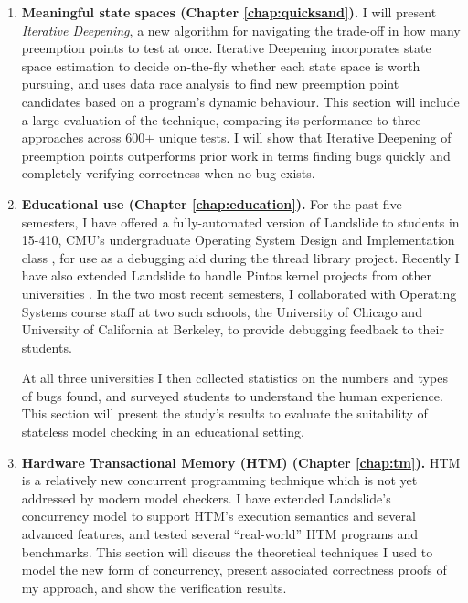 \begin{enumerate}
	\item {\bf Meaningful state spaces (Chapter \ref{chap:quicksand}).}
		I will present {\em Iterative Deepening}, a new algorithm for navigating the trade-off in how many preemption points to test at once.
		Iterative Deepening incorporates state space estimation \cite{estimation} to decide on-the-fly whether each state space is worth pursuing, and uses data race analysis \cite{tsan} to find new preemption point candidates based on a program's dynamic behaviour.
		This section will include a large evaluation of the technique, comparing its performance to three  approaches across 600+ unique tests.
		I will show that Iterative Deepening of preemption points outperforms prior work in terms  finding bugs quickly and completely verifying correctness when no bug exists.
	\item {\bf Educational use (Chapter \ref{chap:education}).}
		For the past five semesters, I have offered a fully-automated version of Landslide to students in 15-410, CMU's undergraduate Operating System Design and Implementation class \cite{kspec,thrlib}, for use as a debugging aid during the thread library project.
		Recently I have also extended Landslide to handle Pintos kernel projects from other universities \cite{pintos}.
		In the two most recent semesters, I collaborated with Operating Systems course staff at two such schools, the University of Chicago and University of California at Berkeley,
		to provide debugging feedback to their students.

		At all three universities I then collected statistics on the numbers and types of bugs found,
		and surveyed students to understand the human experience.
		This section will present the study's results
		to evaluate the suitability of stateless model checking in an educational setting.
	\item {\bf Hardware Transactional Memory (HTM) (Chapter \ref{chap:tm}).}
		HTM is a relatively new concurrent programming technique \cite{htm-haswell,htm-experience}
		which is not yet addressed by modern model checkers.
		I have extended Landslide's concurrency model to support
		HTM's execution semantics and several advanced features, %
		and tested several ``real-world'' HTM programs and benchmarks.
		This section will discuss the theoretical techniques I used to model the new form of concurrency,
		present associated correctness proofs of my approach,
		and show the verification results.
\end{enumerate}

